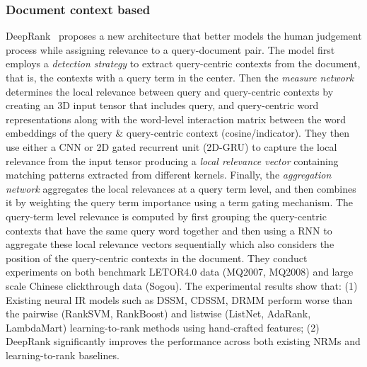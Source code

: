 \subsubsection{Document context based}
\textsf{DeepRank}~\citep{Pang_deeprank_2017} proposes a new architecture that better models the human judgement process while assigning relevance to a query-document pair. The model first employs a \textit{detection strategy} to extract query-centric contexts from the document, that is, the contexts with a query term in the center. Then the \textit{measure network} determines the local relevance between query and query-centric contexts by creating an 3D input tensor that includes query, and query-centric word representations along with the word-level interaction matrix between the word embeddings of the query \& query-centric context (cosine/indicator). They then use either a CNN or 2D gated recurrent unit (2D-GRU) to capture the local relevance from the input tensor producing a \textit{local relevance vector} containing matching patterns extracted from different kernels. Finally, the \textit{aggregation network} aggregates the local relevances at a query term level, and then combines it by weighting the query term importance using a term gating mechanism. The query-term level relevance is computed by first grouping the query-centric contexts that have the same query word together and then using a RNN to aggregate these local relevance vectors sequentially which also considers the position of the query-centric contexts in the document. They conduct experiments on both benchmark LETOR4.0 data (MQ2007, MQ2008) and large scale Chinese clickthrough data (Sogou). The experimental results show that: (1) Existing neural IR models such as DSSM, CDSSM, DRMM perform worse than the pairwise (RankSVM, RankBoost) and listwise (ListNet, AdaRank, LambdaMart) learning-to-rank methods using hand-crafted features; (2) DeepRank significantly improves the performance across both existing NRMs and learning-to-rank baselines.

